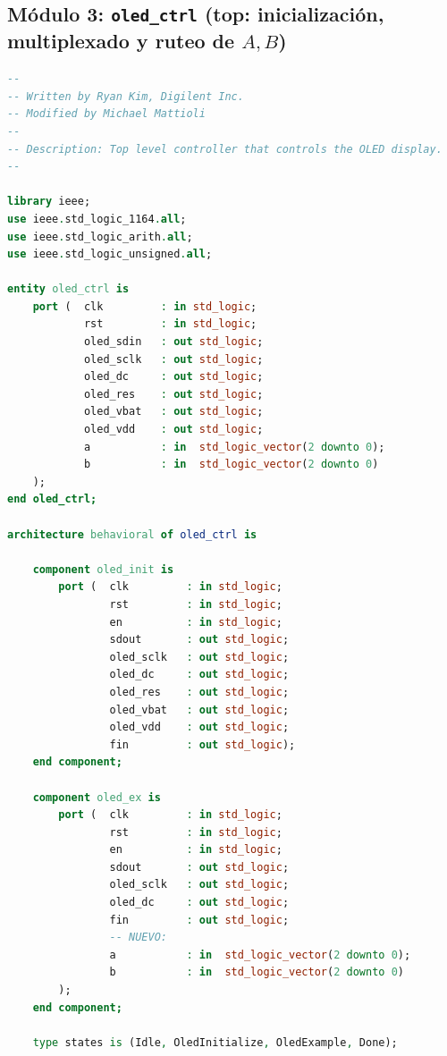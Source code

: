 \documentclass[a4paper,12pt]{article}
\begin{document}
\subsection{Módulo 3: \texttt{oled\_ctrl} (top: inicialización, multiplexado y ruteo de \texorpdfstring{$A,B$}{A,B})}

\begin{lstlisting}[language=VHDL, caption={\texttt{oled\_ctrl.vhd}: top que inicializa la OLED y enruta los switches \texttt{a,b} hacia \texttt{oled\_ex}.}]
--
-- Written by Ryan Kim, Digilent Inc.
-- Modified by Michael Mattioli
--
-- Description: Top level controller that controls the OLED display.
--

library ieee;
use ieee.std_logic_1164.all;
use ieee.std_logic_arith.all;
use ieee.std_logic_unsigned.all;

entity oled_ctrl is
    port (  clk         : in std_logic;
            rst         : in std_logic;
            oled_sdin   : out std_logic;
            oled_sclk   : out std_logic;
            oled_dc     : out std_logic;
            oled_res    : out std_logic;
            oled_vbat   : out std_logic;
            oled_vdd    : out std_logic;
            a           : in  std_logic_vector(2 downto 0);
            b           : in  std_logic_vector(2 downto 0)
    );
end oled_ctrl;

architecture behavioral of oled_ctrl is

    component oled_init is
        port (  clk         : in std_logic;
                rst         : in std_logic;
                en          : in std_logic;
                sdout       : out std_logic;
                oled_sclk   : out std_logic;
                oled_dc     : out std_logic;
                oled_res    : out std_logic;
                oled_vbat   : out std_logic;
                oled_vdd    : out std_logic;
                fin         : out std_logic);
    end component;

    component oled_ex is
        port (  clk         : in std_logic;
                rst         : in std_logic;
                en          : in std_logic;
                sdout       : out std_logic;
                oled_sclk   : out std_logic;
                oled_dc     : out std_logic;
                fin         : out std_logic;
                -- NUEVO:
                a           : in  std_logic_vector(2 downto 0);
                b           : in  std_logic_vector(2 downto 0)
        );
    end component;

    type states is (Idle, OledInitialize, OledExample, Done);


\end{lstlisting}
\end{document}
